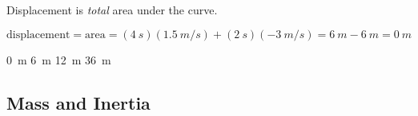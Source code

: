 \documentclass[]{exam}
\begin{document}
\begin{questions}
\ifprintanswers
{\color{red}
Displacement is \textit{total} area under the curve.

$\displaystyle \text{displacement} = \text{area} = (\SI{4}{s})(\SI{1.5}{m/s}) + (\SI{2}{s})(\SI{-3}{m/s}) = \SI{6}{m} - \SI{6}{m} = \boxed{\SI{0}{m}}$
}
\fi

\begin{randomizechoices}
    \correctchoice \SI{0}{m}
    \choice \SI{6}{m}
    \choice \SI{12}{m}
    \choice \SI{36}{m}
\end{randomizechoices}

\end{questions}
    


\clearpage

\subsection{Mass and Inertia}


\end{document}
